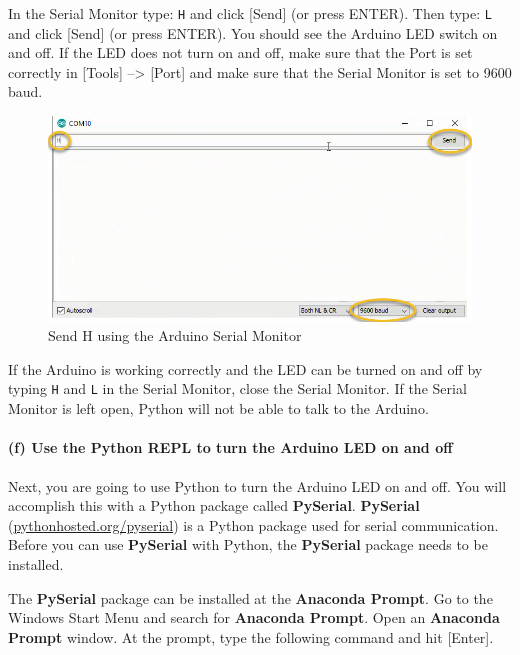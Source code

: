 \documentclass[11pt]{article}
\begin{document}
In the Serial Monitor type: \texttt{H} and click {[}Send{]} (or press
ENTER). Then type: \texttt{L} and click {[}Send{]} (or press ENTER). You
should see the Arduino LED switch on and off. If the LED does not turn
on and off, make sure that the Port is set correctly in {[}Tools{]}
--\textgreater{} {[}Port{]} and make sure that the Serial Monitor is set
to 9600 baud.

\begin{figure}
\centering
\includegraphics{images/serial_monitor_H.png}
\caption{Send H using the Arduino Serial Monitor}
\end{figure}

If the Arduino is working correctly and the LED can be turned on and off
by typing \texttt{H} and \texttt{L} in the Serial Monitor, close the
Serial Monitor. If the Serial Monitor is left open, Python will not be
able to talk to the Arduino.

    \hypertarget{f-use-the-python-repl-to-turn-the-arduino-led-on-and-off}{%
\paragraph{(f) Use the Python REPL to turn the Arduino LED on and
off}\label{f-use-the-python-repl-to-turn-the-arduino-led-on-and-off}}

Next, you are going to use Python to turn the Arduino LED on and off.
You will accomplish this with a Python package called \textbf{PySerial}.
\textbf{PySerial}
(\href{https://pythonhosted.org/pyserial/}{pythonhosted.org/pyserial})
is a Python package used for serial communication. Before you can use
\textbf{PySerial} with Python, the \textbf{PySerial} package needs to be
installed.

The \textbf{PySerial} package can be installed at the \textbf{Anaconda
Prompt}. Go to the Windows Start Menu and search for \textbf{Anaconda
Prompt}. Open an \textbf{Anaconda Prompt} window. At the prompt, type
the following command and hit {[}Enter{]}.
\end{document}
